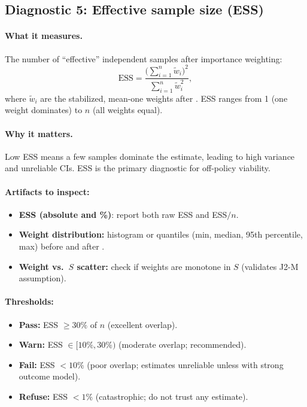 \subsection{Diagnostic 5: Effective sample size (ESS)}

\paragraph{What it measures.} The number of ``effective'' independent samples after importance weighting:
\begin{equation}
\text{ESS} = \frac{\big(\sum_{i=1}^n \tilde{w}_i\big)^2}{\sum_{i=1}^n \tilde{w}_i^2},
\end{equation}
where $\tilde{w}_i$ are the stabilized, mean-one weights after \simcal. ESS ranges from 1 (one weight dominates) to $n$ (all weights equal).

\paragraph{Why it matters.} Low ESS means a few samples dominate the estimate, leading to high variance and unreliable CIs. ESS is the primary diagnostic for off-policy viability.

\paragraph{Artifacts to inspect:}
\begin{itemize}
\item \textbf{ESS (absolute and \%)}: report both raw ESS and ESS$/n$.
\item \textbf{Weight distribution:} histogram or quantiles (min, median, 95th percentile, max) before and after \simcal.
\item \textbf{Weight vs.\ $S$ scatter:} check if weights are monotone in $S$ (validates J2-M assumption).
\end{itemize}

\paragraph{Thresholds:}
\begin{itemize}
\item \textbf{Pass:} ESS $\ge 30\%$ of $n$ (excellent overlap).
\item \textbf{Warn:} ESS $\in [10\%, 30\%)$ (moderate overlap; \dr{} recommended).
\item \textbf{Fail:} ESS $< 10\%$ (poor overlap; estimates unreliable unless \dr{} with strong outcome model).
\item \textbf{Refuse:} ESS $< 1\%$ (catastrophic; do not trust any estimate).
\end{itemize}

